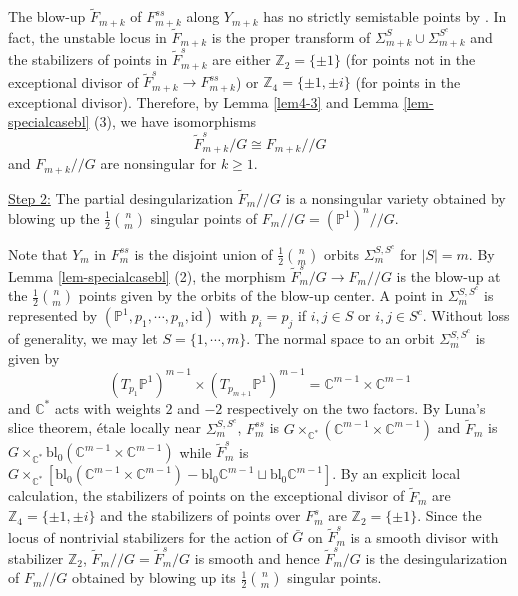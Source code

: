 \documentclass[10pt]{amsart}
\theoremstyle{definition}
\newcommand{\PP}{\mathbb{P}}
\newcommand{\CC}{\mathbb{C}}
\newcommand{\ZZ}{\mathbb{Z}}
\def\git{/\!/ }
\begin{document}
The blow-up $\tilde{F}_{m+k}$ of $F_{m+k}^{ss}$ along $Y_{m+k}$
has no strictly semistable points by \cite[\S6]{Kirwan}. In fact,
the unstable locus in $\tilde{F}_{m+k}$ is the proper transform of
$\Sigma^S_{m+k}\cup \Sigma^{S^c}_{m+k}$ and the stabilizers of
points in $\tilde{F}^s_{m+k}$ are either $\ZZ_2=\{\pm 1\}$ (for
points not in the exceptional divisor of $\tilde{F}^s_{m+k}\to
F^{ss}_{m+k}$) or $\ZZ_4=\{\pm 1,\pm i\}$ (for points in the
exceptional divisor). Therefore, by Lemma \ref{lem4-3} and Lemma
\ref{lem-specialcasebl} (3), we have isomorphisms
\begin{equation}\label{eq4-10}
\tilde{F}_{m+k}^s/G\cong F_{m+k}\git G \end{equation} and
$F_{m+k}\git G$ are nonsingular for $k\ge 1$.

\bigskip
\noindent \underline{Step 2:} The partial desingularization
$\tilde{F}_m\git G$ is a nonsingular variety obtained by blowing
up the $\frac12\binom{n}{m}$ singular points of $F_m\git
G=(\PP^1)^n\git G$.

\bigskip
Note that $Y_m$ in $F_m^{ss}$ is the disjoint union of
$\frac12\binom{n}{m}$ orbits $\Sigma_m^{S,S^c}$ for $|S|=m$. By
Lemma \ref{lem-specialcasebl} (2), the morphism
$\tilde{F}_m^s/G\to F_m\git G$ is the blow-up at the
$\frac12\binom{n}{m}$ points given by the orbits of the blow-up
center. A point in $\Sigma^{S,S^c}_{m}$ is represented by
$(\PP^1,p_1,\cdots,p_n,\mathrm{id})$ with $p_i=p_j$ if $i,j\in S$
or $i,j\in S^c$. Without loss of generality, we may let
$S=\{1,\cdots, m\}$. The normal space to an orbit
$\Sigma^{S,S^c}_{m}$ is given by
\[
(T_{p_1}\PP^1)^{m-1}\times
(T_{p_{m+1}}\PP^1)^{m-1}=\CC^{m-1}\times\CC^{m-1}
\]
and $\CC^*$ acts with weights $2$ and $-2$ respectively on the two
factors. By Luna's slice theorem, \'etale locally near
$\Sigma^{S,S^c}_{m}$, $F_m^{ss}$ is
$G\times_{\CC^*}(\CC^{m-1}\times\CC^{m-1})$ and $\tilde{F}_m$ is
$G\times_{\CC^*}\mathrm{bl}_{0}(\CC^{m-1}\times\CC^{m-1})$ while
$\tilde{F}_m^s$ is
$G\times_{\CC^*}\left[\mathrm{bl}_{0}(\CC^{m-1}\times\CC^{m-1})
-\mathrm{bl}_{0}\CC^{m-1}\sqcup \mathrm{bl}_{0}\CC^{m-1}\right]$.
By an explicit local calculation, the stabilizers of points on the
exceptional divisor of $\widetilde{F}_m$ are $\ZZ_4=\{\pm 1,\pm
i\}$ and the stabilizers of points over $F_m^s$ are $\ZZ_2=\{\pm
1\}$. Since the locus of nontrivial stabilizers for the action of
$\bar G$ on $\tilde{F}^s_m$ is a smooth divisor with stabilizer
$\ZZ_2$, $\tilde{F}_m\git G=\tilde{F}^s_m/G$ is smooth and hence
$\tilde{F}_m^s/G$ is the desingularization of $F_m\git G$ obtained
by blowing up its $\frac12\binom{n}{m}$ singular points.
\end{document}
